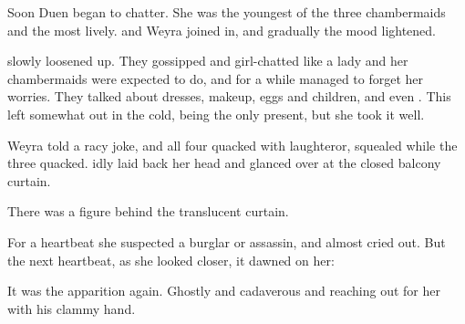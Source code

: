 




% 
Soon Duen began to chatter. 
She was the youngest of the three chambermaids and the most lively. 
\Piacet{} and Weyra joined in, and gradually the mood lightened. 

\Tiroco{} slowly loosened up. 
They gossipped and girl-chatted like a lady and her chambermaids were expected to do, and for a while \Tiroco{} managed to forget her worries. 
They talked about dresses, makeup, eggs and children, and even \daxes. 
This left \Piacet{} somewhat out in the cold, being the only \human{} present, but she took it well. 







Weyra told a racy joke, and all four quacked with laughter\dash or, \Piacet{} squealed while the three \sphyles{} quacked. 
\Tiroco{} idly laid back her head and glanced over at the closed balcony curtain. 


There was a figure behind the translucent curtain. 

For a heartbeat she suspected a burglar or assassin, and almost cried out. 
But the next heartbeat, as she looked closer, it dawned on her:

\tho{\Icor!}

It was the apparition again. 
Ghostly and cadaverous and reaching out for her with his clammy hand. 





